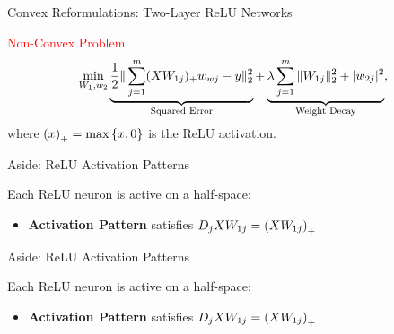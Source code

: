 \documentclass[usenames,dvipsnames,mathserif,notheorems]{beamer}
\begin{document}
\begin{frame}{Convex Reformulations: Two-Layer ReLU Networks}

	{\large \textcolor{Red}{Non-Convex Problem}}
	\[
		\min_{W_1, w_2} \underbrace{\frac 1 2 \|\sum_{j=1}^m (X W_{1j})_+ w_{wj} - y\|_2^2}_{\text{Squared Error}}
		+ \underbrace{\lambda \sum_{j=1}^m \|W_{1j}\|_2^2 + |w_{2j}|^2}_{\text{Weight Decay}},
	\]
	where \( \left(x\right)_+ = \max\left\{x, 0\right\} \) is the ReLU activation.
	\pause

	\begin{figure}[]
		\centering
		
	\end{figure}

\end{frame}

\begin{frame}{Aside: ReLU Activation Patterns}

	Each ReLU neuron is active on a half-space:

	\pause
	\begin{figure}[]
		\centering
		
	\end{figure}

	\pause
	\begin{itemize}
		\item \textbf{Activation Pattern} satisfies \( D_j X W_{1j} = \left(X W_{1j}\right)_+ \)
	\end{itemize}

\end{frame}

\begin{frame}{Aside: ReLU Activation Patterns}

	Each ReLU neuron is active on a half-space:

	\begin{figure}[]
		\centering
		
	\end{figure}


	\begin{itemize}
		\item \textbf{Activation Pattern} satisfies \( D_j X W_{1j} = \left(X W_{1j}\right)_+ \)
	\end{itemize}

\end{frame}
\end{document}
